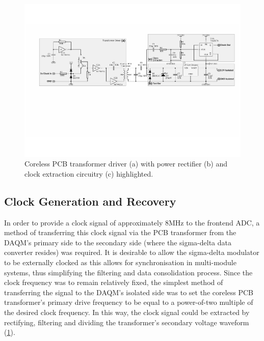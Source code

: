 \documentclass[conference]{IEEEtran}
\begin{document}
	\begin{figure}[t]
		\centering
		\includegraphics[width=1.0\textwidth]{./img/TFpwrclk_BW}
		\caption{Coreless PCB transformer driver (a) with power rectifier (b) and clock extraction circuitry (c) highlighted.}
		\label{fig:TFpwrclk}
	\end{figure}	
	
	\subsection{Clock Generation and Recovery} %
	In order to provide a clock signal of approximately 8MHz to the frontend ADC, a method of transferring this clock signal via the PCB transformer from the DAQM's primary side to the secondary side (where the sigma-delta data converter resides) was required.  It is desirable to allow the sigma-delta modulator to be externally clocked as this allows for synchronisation in multi-module systems, thus simplifying the filtering and data consolidation process.  Since the clock frequency was to remain relatively fixed, the simplest method of transferring the signal to the DAQM's isolated side was to set the coreless PCB transformer's primary drive frequency to be equal to a power-of-two multiple of the desired clock frequency.  In this way, the clock signal could be extracted by rectifying, filtering and dividing the transformer's secondary voltage waveform (\ref{fig:TFpwrclk}).
	
\end{document}
